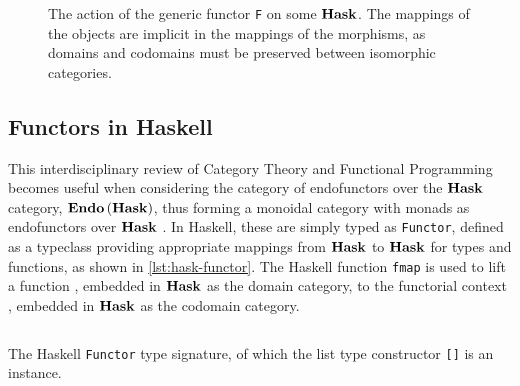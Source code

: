 \documentclass[10pt,a4paper,reqno]{amsart}
\newcommand{\inlinehask}[1]{\texttt{#1}}
\newcommand{\barehask}[1]{\Colorbox{codebg}{\lstinline[style = inlineHask]{#1}}}
\newcommand{\haskmath}[2]{%
        \ensuremath\text{\Colorbox{codebg}{%
                \vphantom{\lstinline[basicstyle = \haskMorphStyle]{fg}}%
                \lstinline[style = inlineHask, basicstyle = #2]{#1}%
        }}%
}
\newcommand{\haskMorphStyle}{\normalsize\ttfamily\color{haskkeyword}}
\newcommand{\haskObjStyle}{\normalsize\ttfamily\color{black}}
\newcommand{\haskFuncStyle}{\normalsize\ttfamily\color{haskkeyword}\bfseries}
\numberwithin{equation}{section}
\numberwithin{figure}{section}
\begin{document}
\begin{figure}[ht]
        \centering
        \vspace{1.5em}
        \caption{The action of the generic functor \inlinehask{F} on some
                $\operatorname{\mathbf{Hask}}$. The mappings of the objects are implicit in the
                mappings of the morphisms, as domains and codomains must be
                preserved between isomorphic categories.}
        \vspace{1.5em}
        \label{fig:functor-general-fmap}
\end{figure}

\subsection{Functors in Haskell}

This interdisciplinary review of Category Theory and Functional Programming
becomes useful when considering the category of endofunctors over the $\operatorname{\mathbf{Hask}}$
category, $\operatorname{\mathbf{Endo}}{(\operatorname{\mathbf{Hask}})}$, thus forming a monoidal category with monads
as endofunctors over $\operatorname{\mathbf{Hask}}$ \autocite{Milewski:2019}. In Haskell, these are
simply typed as \inlinehask{Functor}, defined as a typeclass providing
appropriate mappings from $\operatorname{\mathbf{Hask}}$ to $\operatorname{\mathbf{Hask}}$ for types and functions, as
shown in \autoref{lst:hask-functor}. The Haskell function \inlinehask{fmap} is
used to lift a function \barehask{a -> b}, embedded in $\operatorname{\mathbf{Hask}}$ as the domain
category, to the functorial context \barehask{f a -> f b}, embedded in
$\operatorname{\mathbf{Hask}}$ as the codomain category.
\begin{listing}[ht]
        \inputminted{haskell}{haskell/Functor.hs}%
        \caption{The Haskell \texttt{Functor} type signature, of which the list
                type constructor \inlinehask{[]} is an instance.}
        \label{lst:hask-functor}
\end{listing}
\end{document}
